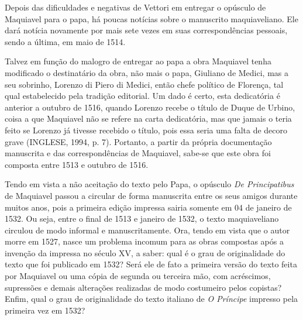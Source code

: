 Depois das dificuldades e negativas de Vettori em entregar o opúsculo de
Maquiavel para o papa, há poucas notícias sobre o manuscrito
maquiaveliano. Ele dará notícia novamente por mais sete vezes em suas
correspondências pessoais, sendo a última, em maio de 1514.

Talvez em função do malogro de entregar ao papa a obra Maquiavel tenha
modificado o destinatário da obra, não mais o papa, Giuliano de Medici,
mas a seu sobrinho, Lorenzo di Piero di Medici, então chefe político de
Florença, tal qual estabelecido pela tradição editorial. Um dado é
certo, esta dedicatória é anterior a outubro de 1516, quando Lorenzo
recebe o título de Duque de Urbino, coisa a que Maquiavel não se refere
na carta dedicatória, mas que jamais o teria feito se Lorenzo já tivesse
recebido o título, pois essa seria uma falta de decoro grave (INGLESE,
1994, p. 7). Portanto, a partir da própria documentação manuscrita e das
correspondências de Maquiavel, sabe-se que este obra foi composta entre
1513 e outubro de 1516.

Tendo em vista a não aceitação do texto pelo Papa, o opúsculo \emph{De
Principatibus} de Maquiavel passou a circular de forma manuscrita entre
os seus amigos durante muitos anos, pois a primeira edição impressa
sairia somente em 04 de janeiro de 1532. Ou seja, entre o final de 1513
e janeiro de 1532, o texto maquiaveliano circulou de modo informal e
manuscritamente. Ora, tendo em vista que o autor morre em 1527, nasce um
problema incomum para as obras compostas após a invenção da impressa no
século XV, a saber: qual é o grau de originalidade do texto que foi
publicado em 1532? Será ele de fato a primeira versão do texto feita por
Maquiavel ou uma cópia de segunda ou terceira mão, com acréscimos,
supressões e demais alterações realizadas de modo costumeiro pelos
copistas? Enfim, qual o grau de originalidade do texto italiano de
\emph{O Príncipe} impresso pela primeira vez em 1532?

